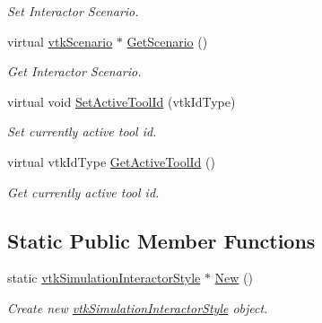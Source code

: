 \begin{DoxyCompactItemize}
\begin{DoxyCompactList}\small\item\em Set Interactor Scenario. \item\end{DoxyCompactList}\item 
\hypertarget{classvtkSimulationInteractorStyle_aa99ed04980f283f704e6276bc70e4f96}{
virtual \hyperlink{classvtkScenario}{vtkScenario} $\ast$ \hyperlink{classvtkSimulationInteractorStyle_aa99ed04980f283f704e6276bc70e4f96}{GetScenario} ()}
\label{classvtkSimulationInteractorStyle_aa99ed04980f283f704e6276bc70e4f96}

\begin{DoxyCompactList}\small\item\em Get Interactor Scenario. \item\end{DoxyCompactList}\item 
\hypertarget{classvtkSimulationInteractorStyle_a866ff36ea2e0d174df525163182e9563}{
virtual void \hyperlink{classvtkSimulationInteractorStyle_a866ff36ea2e0d174df525163182e9563}{SetActiveToolId} (vtkIdType)}
\label{classvtkSimulationInteractorStyle_a866ff36ea2e0d174df525163182e9563}

\begin{DoxyCompactList}\small\item\em Set currently active tool id. \item\end{DoxyCompactList}\item 
\hypertarget{classvtkSimulationInteractorStyle_a0cc197fbb2fa3c0d984a0c7e24bdbfe4}{
virtual vtkIdType \hyperlink{classvtkSimulationInteractorStyle_a0cc197fbb2fa3c0d984a0c7e24bdbfe4}{GetActiveToolId} ()}
\label{classvtkSimulationInteractorStyle_a0cc197fbb2fa3c0d984a0c7e24bdbfe4}

\begin{DoxyCompactList}\small\item\em Get currently active tool id. \item\end{DoxyCompactList}\end{DoxyCompactItemize}
\subsection*{Static Public Member Functions}
\begin{DoxyCompactItemize}
\item 
\hypertarget{classvtkSimulationInteractorStyle_ae9cb9b035e07e5b99b2abc6be4100719}{
static \hyperlink{classvtkSimulationInteractorStyle}{vtkSimulationInteractorStyle} $\ast$ \hyperlink{classvtkSimulationInteractorStyle_ae9cb9b035e07e5b99b2abc6be4100719}{New} ()}
\label{classvtkSimulationInteractorStyle_ae9cb9b035e07e5b99b2abc6be4100719}

\begin{DoxyCompactList}\small\item\em Create new \hyperlink{classvtkSimulationInteractorStyle}{vtkSimulationInteractorStyle} object. \item\end{DoxyCompactList}\end{DoxyCompactItemize}


